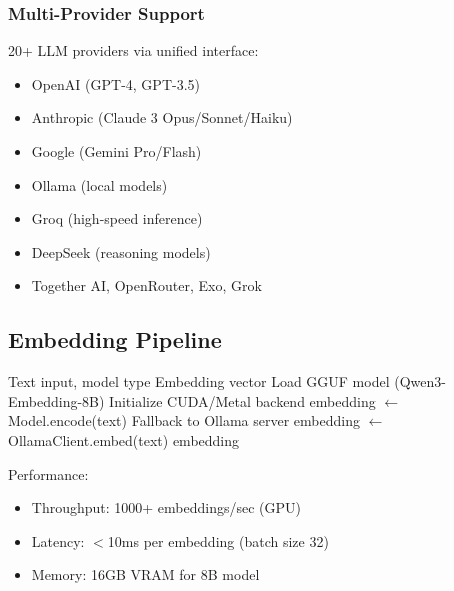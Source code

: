 \subsubsection{Multi-Provider Support}

20+ LLM providers via unified interface:
\begin{itemize}
\item OpenAI (GPT-4, GPT-3.5)
\item Anthropic (Claude 3 Opus/Sonnet/Haiku)
\item Google (Gemini Pro/Flash)
\item Ollama (local models)
\item Groq (high-speed inference)
\item DeepSeek (reasoning models)
\item Together AI, OpenRouter, Exo, Grok
\end{itemize}

\subsection{Embedding Pipeline}

\begin{algorithm}
\caption{Native Embedding Generation}
\begin{algorithmic}[1]
\REQUIRE Text input, model type
\ENSURE Embedding vector
    \STATE Load GGUF model (Qwen3-Embedding-8B)
        \STATE Initialize CUDA/Metal backend
    \ENDIF
    \STATE embedding $\leftarrow$ Model.encode(text)
        \STATE Fallback to Ollama server
    \ENDIF
\ELSE
    \STATE embedding $\leftarrow$ OllamaClient.embed(text)
\ENDIF
\RETURN embedding
\end{algorithmic}
\end{algorithm}

Performance:
\begin{itemize}
\item Throughput: 1000+ embeddings/sec (GPU)
\item Latency: $<$10ms per embedding (batch size 32)
\item Memory: 16GB VRAM for 8B model
\end{itemize}

